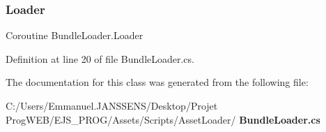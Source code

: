 \mbox{\label{class_bundle_loader_a19ce0afad37f5af1f3135cbd32358699}} 
\subsubsection{Loader}
{\footnotesize\ttfamily Coroutine Bundle\+Loader.\+Loader}



Definition at line 20 of file Bundle\+Loader.\+cs.



The documentation for this class was generated from the following file\+:\begin{DoxyCompactItemize}
\item 
C\+:/\+Users/\+Emmanuel.\+J\+A\+N\+S\+S\+E\+N\+S/\+Desktop/\+Projet Prog\+W\+E\+B/\+E\+J\+S\+\_\+\+P\+R\+O\+G/\+Assets/\+Scripts/\+Asset\+Loader/\textbf{ Bundle\+Loader.\+cs}\end{DoxyCompactItemize}
